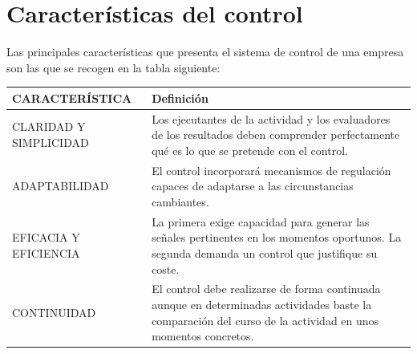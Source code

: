 \documentclass[
]{krantz}
\begin{document}
\hypertarget{caracteruxedsticas-del-control}{%
\section{Características del control}\label{caracteruxedsticas-del-control}}

Las principales características que presenta el sistema de control de una empresa son las que se recogen en la tabla siguiente:

\begin{longtable}[]{@{}ll@{}}
\toprule
\begin{minipage}[b]{0.55\columnwidth}\raggedright
CARACTERÍSTICA\strut
\end{minipage} & \begin{minipage}[b]{0.39\columnwidth}\raggedright
Definición\strut
\end{minipage}\tabularnewline
\midrule
\endhead
\begin{minipage}[t]{0.55\columnwidth}\raggedright
CLARIDAD Y SIMPLICIDAD\strut
\end{minipage} & \begin{minipage}[t]{0.39\columnwidth}\raggedright
Los ejecutantes de la actividad y los evaluadores de los resultados deben comprender perfectamente qué es lo que se pretende con el control.\strut
\end{minipage}\tabularnewline
\begin{minipage}[t]{0.55\columnwidth}\raggedright
ADAPTABILIDAD\strut
\end{minipage} & \begin{minipage}[t]{0.39\columnwidth}\raggedright
El control incorporará mecanismos de regulación capaces de adaptarse a las circunstancias cambiantes.\strut
\end{minipage}\tabularnewline
\begin{minipage}[t]{0.55\columnwidth}\raggedright
EFICACIA Y EFICIENCIA\strut
\end{minipage} & \begin{minipage}[t]{0.39\columnwidth}\raggedright
La primera exige capacidad para generar las señales pertinentes en los momentos oportunos. La segunda demanda un control que justifique su coste.\strut
\end{minipage}\tabularnewline
\begin{minipage}[t]{0.55\columnwidth}\raggedright
CONTINUIDAD\strut
\end{minipage} & \begin{minipage}[t]{0.39\columnwidth}\raggedright
El control debe realizarse de forma continuada aunque en determinadas actividades baste la comparación del curso de la actividad en unos momentos concretos.\strut

\end{minipage}
\end{longtable}
\end{document}
